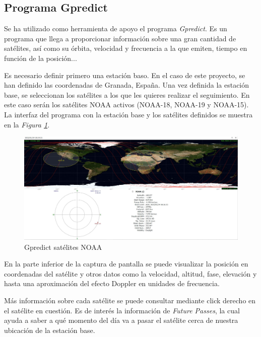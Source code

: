 \documentclass[a4paper,openright,12pt]{article}
\begin{document}
	\subsection{Programa Gpredict}
	Se ha utilizado como herramienta de apoyo el programa \textit{Gpredict}. Es un programa que llega a proporcionar información sobre una gran cantidad de satélites, así como su órbita, velocidad y frecuencia a la que emiten, tiempo en función de la posición...
	
	Es necesario definir primero una estación baso. En el caso de este proyecto, se han definido las coordenadas de Granada, España. Una vez definida la estación base, se seleccionan los satélites a los que les quieres realizar el seguimiento. En este caso serán los satélites NOAA activos (NOAA-18, NOAA-19 y NOAA-15). La interfaz del programa con la estación base y los satélites definidos se muestra en la \textit{Figura \ref{gpredict}}.
	
	\begin{figure}[hbtp]
 \centering
 \includegraphics[width = 16cm]{imagenes/Gpredict_NOAA.JPG}
 \caption{Gpredict satélites NOAA}
 \label{gpredict}
 \end{figure}
 
 En la parte inferior de la captura de pantalla se puede visualizar la posición en coordenadas del satélite y otros datos como la velocidad, altitud, fase, elevación y hasta una aproximación del efecto Doppler en unidades de frecuencia.
 
 Más información sobre cada satélite se puede consultar mediante click derecho en el satélite en cuestión. Es de interés la información de \textit{Future Passes}, la cual ayuda a saber a qué momento del día va a pasar el satélite cerca de nuestra ubicación de la estación base.
\end{document}
